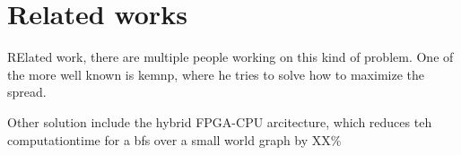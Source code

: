 \chapter{Related works}
RElated work, there are multiple people working on this kind of problem. One of the more well known is kemnp, where he tries to solve how to maximize the spread. 


Other solution include the hybrid FPGA-CPU arcitecture, which reduces teh computationtime for a bfs over a small world graph by XX\%\cite{YamanPOaper} 